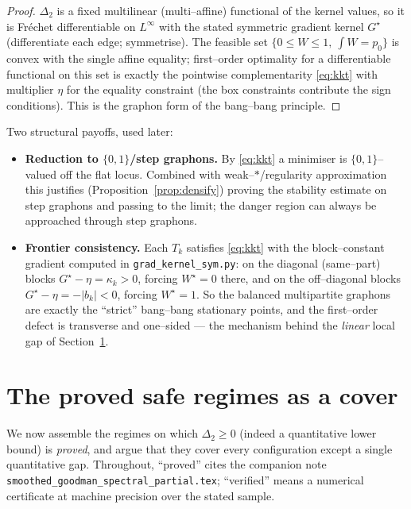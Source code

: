 \documentclass[11pt]{article}
\theoremstyle{definition}
\newcommand{\Tk}{T_k}
\begin{document}
\begin{proof}
$\Delta_2$ is a fixed multilinear (multi--affine) functional of the kernel values,
so it is Fr\'echet differentiable on $L^\infty$ with the stated symmetric gradient
kernel $G^\star$ (differentiate each edge; symmetrise).  The feasible set
$\{0\le W\le1,\ \int W=p_0\}$ is convex with the single affine equality; first--order
optimality for a differentiable functional on this set is exactly the pointwise
complementarity \eqref{eq:kkt} with multiplier $\eta$ for the equality constraint
(the box constraints contribute the sign conditions).  This is the graphon form of
the bang--bang principle.
\end{proof}

Two structural payoffs, used later:
\begin{itemize}[leftmargin=1.4em]
\item \textbf{Reduction to $\{0,1\}$/step graphons.}  By \eqref{eq:kkt} a minimiser
is $\{0,1\}$--valued off the flat locus.  Combined with weak--$*$/regularity
approximation this justifies (Proposition~\ref{prop:densify}) proving the stability
estimate on step graphons and passing to the limit; the danger region can always be
approached through step graphons.
\item \textbf{Frontier consistency.}  Each $\Tk$ satisfies \eqref{eq:kkt} with the
block--constant gradient computed in \texttt{grad\_kernel\_sym.py}: on the diagonal
(same--part) blocks $G^\star-\eta=\kappa_k>0$, forcing $W^\star=0$ there, and on the
off--diagonal blocks $G^\star-\eta=-|b_k|<0$, forcing $W^\star=1$.  So the balanced
multipartite graphons are exactly the ``strict'' bang--bang stationary points, and
the first--order defect is transverse and one--sided --- the mechanism behind the
\emph{linear} local gap of Section~\ref{sec:cover}.
\end{itemize}

\section{The proved safe regimes as a cover}\label{sec:cover}

We now assemble the regimes on which $\Delta_2\ge0$ (indeed a quantitative lower
bound) is \emph{proved}, and argue that they cover every configuration except a
single quantitative gap.  Throughout, ``proved'' cites the companion note
\texttt{smoothed\_goodman\_spectral\_partial.tex}; ``verified'' means a numerical
certificate at machine precision over the stated sample.
\end{document}
